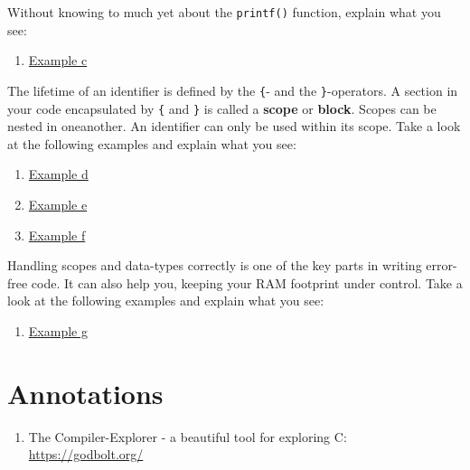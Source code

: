 \documentclass{dcbl/challenge}
\begin{document}
\begin{aufgabe}
    Without knowing to much yet about the \texttt{printf()} function, explain what you see:
    \begin{enumerate}
        \item \href{https://godbolt.org/z/f7M7bfaeK}{Example c}
    \end{enumerate}

\end{aufgabe}

\begin{aufgabe}
    The lifetime of an identifier is defined by the \texttt{\{}- and the \texttt{\}}-operators.
    A section in your code encapsulated by \texttt{\{} and \texttt{\}} is called a \textbf{scope} or \textbf{block}.
    Scopes can be nested in oneanother. 
    An identifier can only be used within its scope.
    Take a look at the following examples and explain what you see:
    \begin{enumerate}
        \item \href{https://godbolt.org/z/TErMKafjW}{Example d}
        \item \href{https://godbolt.org/z/GdbqM5b9h}{Example e}
        \item \href{https://godbolt.org/z/jhrsvsja6}{Example f}
    \end{enumerate}
\end{aufgabe}

\begin{aufgabe}
    Handling scopes and data-types correctly is one of the key parts in writing error-free code.
    It can also help you, keeping your RAM footprint under control.
    Take a look at the following examples and explain what you see:
    \begin{enumerate}
        \item \href{https://godbolt.org/z/eaG6f7q66}{Example g}
    \end{enumerate}
\end{aufgabe}

\section*{Annotations}
\begin{enumerate}
    \item The Compiler-Explorer - a beautiful tool for exploring C: \url{https://godbolt.org/}
\end{enumerate}
\end{document}
